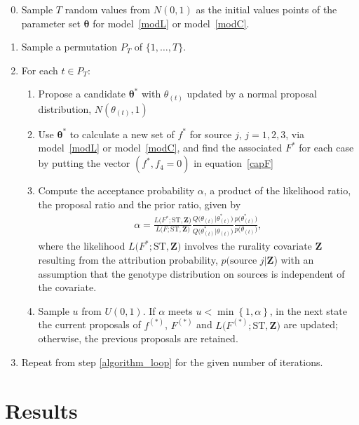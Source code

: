 \documentclass[times, doublespace]{simauth}%
\begin{document}
\begin{enumerate}
\setcounter{enumi}{-1}
\item Sample $T$ random values from $N(0,1)$ as the initial values points of the parameter set $\boldsymbol{\theta}$ for model~\eqref{modL} or model~\eqref{modC}.
\item Sample a permutation $P_T$ of $\{1, \ldots, T\}$.\label{algorithm_loop}
\item For each $t \in P_T$:
\begin{enumerate}
\item Propose a candidate $\boldsymbol{\theta}^*$ with $\theta_{(t)}$ updated by a normal proposal distribution, $N(\theta_{(t)}, 1)$

\item Use $\boldsymbol{\theta}^*$ to calculate a new set of $f^*$ for source $j$, $j=1, 2, 3$, via model~\eqref{modL} or model~\eqref{modC}, and find the associated $F^*$ for each case by putting the vector $(f^*, f_4=0)$ in equation~\eqref{capF}

\item Compute the acceptance probability $\alpha$, a product of the likelihood ratio, the proposal ratio and the prior ratio, given by
\begin{align*}
\alpha=\frac{L\Big(F^*; \text{ST}, \boldsymbol{Z}\Big)}{L\Big(F; \text{ST}, \boldsymbol{Z}\Big)}\frac{Q\Big(\theta_{(t)} \vert \theta_{(t)}^*\Big)}{Q\Big(\theta_{(t)}^* \vert \theta_{(t)}\Big)}\frac{p\Big(\theta_{(t)}^*\Big)}{p\Big(\theta_{(t)}\Big)}, 
\end{align*}
where the likelihood $L\Big(F^*; \text{ST}, \boldsymbol{Z}\Big)$ involves the rurality covariate $\boldsymbol{Z}$ resulting from the attribution probability, $p(\text{source }j\vert \boldsymbol{Z}$) with an assumption that the genotype distribution on sources is independent of the covariate.
\item Sample $u$ from $U(0,1)$. If $\alpha$ meets $u < \min \left\{1, \alpha \right\}$, in the next state the current proposals of $f^{(*)}$, $F^{(*)}$ and $L\Big(F^{(*)}; \text{ST}, \boldsymbol{Z}\Big)$ are updated; otherwise, the previous proposals are retained.
\end{enumerate}
\item Repeat from step \ref{algorithm_loop} for the given number of iterations.

\end{enumerate}

\section{Results}
\end{document}
